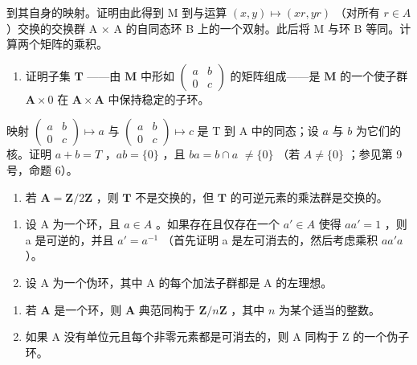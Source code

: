 到其自身的映射。证明由此得到 M 到与运算 \((x, y) \mapsto (xr, yr)\) （对所有 \(r \in A\)）交换的交换群 A × A 的自同态环 B 上的一个双射。此后将 M 与环 B 等同。计算两个矩阵的乘积。

\begin{enumerate}
\def\labelenumi{(\alph{enumi})}
\setcounter{enumi}{2}
\tightlist
\item
  证明子集 \(\mathbf{T}\) ——由 \(\mathbf{M}\) 中形如 \(\begin{pmatrix} a & b \\ 0 & c \end{pmatrix}\) 的矩阵组成——是 \(\mathbf{M}\) 的一个使子群 \(\mathbf{A} \times 0\) 在 \(\mathbf{A} \times \mathbf{A}\) 中保持稳定的子环。
\end{enumerate}

映射 \(\begin{pmatrix} a & b \\ 0 & c \end{pmatrix} \mapsto a\) 与 \(\begin{pmatrix} a & b \\ 0 & c \end{pmatrix} \mapsto c\) 是 T 到 A 中的同态；设 \(a\) 与 \(b\) 为它们的核。证明 \(a + b = T\) ，\(ab = \{0\}\) ，且 \(ba = b \cap a\) \(\neq \{0\}\) （若 \(A \neq \{0\}\) ；参见第 9 号，命题 6）。

\begin{enumerate}
\def\labelenumi{(\alph{enumi})}
\setcounter{enumi}{3}
\tightlist
\item
  若 \(\mathbf{A} = \mathbf{Z} / 2\mathbf{Z}\) ，则 \(\mathbf{T}\) 不是交换的，但 \(\mathbf{T}\) 的可逆元素的乘法群是交换的。
\end{enumerate}

\begin{enumerate}
\def\labelenumi{\arabic{enumi}.}
\setcounter{enumi}{2}
\item
  设 A 为一个环，且 \(a \in A\) 。如果存在且仅存在一个 \(a' \in A\) 使得 \(aa' = 1\) ，则 a 是可逆的，并且 \(a' = a^{-1}\) （首先证明 a 是左可消去的，然后考虑乘积 \(aa'a\)）。
\item
  设 A 为一个伪环，其中 A 的每个加法子群都是 A 的左理想。
\end{enumerate}

\begin{enumerate}
\def\labelenumi{(\alph{enumi})}
\item
  若 \(\mathbf{A}\) 是一个环，则 \(\mathbf{A}\) 典范同构于 \(\mathbf{Z} / n\mathbf{Z}\) ，其中 \(n\) 为某个适当的整数。
\item
  如果 A 没有单位元且每个非零元素都是可消去的，则 A 同构于 Z 的一个伪子环。
\end{enumerate}

